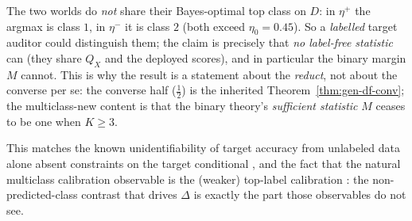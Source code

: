 \begin{remark}\label{rmk:mc-thirdclass-honest}
The two worlds do \emph{not} share their Bayes-optimal top class on $D$: in $\eta^+$ the
argmax is class $1$, in $\eta^-$ it is class $2$ (both exceed $\eta_0=0.45$). So a
\emph{labelled} target auditor could distinguish them; the claim is precisely that
\emph{no label-free statistic} can (they share $Q_X$ and the deployed scores), and in
particular the binary margin $M$ cannot. This is why the result is a statement about the
\emph{reduct}, not about the converse per se: the converse half ($\tfrac12$) is the
inherited Theorem~\ref{thm:gen-df-conv}; the multiclass-new content is that the binary
theory's \emph{sufficient statistic} $M$ ceases to be one when $K\ge3$.
\end{remark}

\noindent This matches the known unidentifiability of target accuracy from unlabeled data
alone absent constraints on the target conditional \citep{garg2022atc}, and the fact that the
natural multiclass calibration observable is the (weaker) top-label calibration
\citep{gupta2021toplabel}: the non-predicted-class contrast that drives $\Delta$ is exactly
the part those observables do not see.

